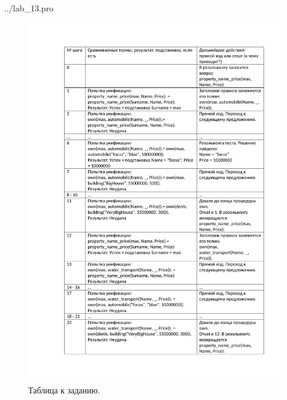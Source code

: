 \begin{lstinputlisting}[label=third,caption=Решение задания №1, language=prolog, firstline=1, lastline=53]{../lab_13.pro}
\end{lstinputlisting}

\begin{figure}[H]
	\caption{Таблица к заданию.}
	\begin{center}
		\includegraphics[scale=0.85]{img/13.1.pdf}
	\end{center}
	
\end{figure}

